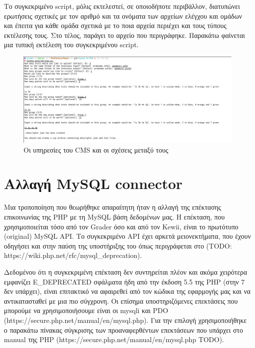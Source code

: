 \documentclass[diploma]{softlab-thesis}
\begin{document}
\bigskip

Το συγκεκριμένο script, μόλις εκτελεστεί, σε οποιοδήποτε περιβάλλον, διατυπώνει
ερωτήσεις σχετικές με τον αριθμό και τα ονόματα των αρχείων ελέγχου και ομάδων
και έπειτα για κάθε ομάδα σχετικά με το ποια αρχεία περιέχει και τους τύπους
εκτέλεσης τους. Στο τέλος, παράγει το αρχείο που περιγράφηκε. Παρακάτω φαίνεται
μια τυπική εκτέλεση του συγκεκριμένου script.


\begin{figure}
  \centering
  \includegraphics[scale=0.4,trim=4 4 4 4,clip]{Figures/interactive.png}
  \caption[Παράδειγμα χρήσης interactive generator script]{Οι υπηρεσίες του CMS και οι σχέσεις μεταξύ τους}
\end{figure}

\section{Αλλαγή MySQL connector}

Μια τροποποίηση που θεωρήθηκε απαραίτητη ήταν η αλλαγή της επέκτασης
επικοινωνίας της PHP με τη MySQL βάση δεδομένων μας. Η επέκταση, που
χρησιμοποιείται τόσο από τον Grader όσο και από τον Kewii, είναι το πρωτότυπο
(original) MySQL API. Το συγκεκριμένο API έχει αρκετά μειονεκτήματα, που έχουν
οδηγήσει και στην παύση της υποστήριξης του όπως περιγράφεται στο (TODO:
https://wiki.php.net/rfc/mysql\_deprecation).

\bigskip

Δεδομένου ότι η συγκεκριμένη επέκταση δεν συντηρείται πλέον και ακόμα χειρότερα
εμφανίζει E\_DEPRECATED σφάλματα ήδη από την έκδοση 5.5 της PHP (στην 7 δεν
υπάρχει), είναι επιτακτικό να αφαιρεθεί από τον κώδικα της εφαρμογής μας και να
αντικατασταθεί με μια πιο σύγχρονη. Οι επίσημα υποστηριζόμενες επεκτάσεις που
μπορούμε να χρησιμοποιήσουμε είναι οι mysqli και PDO
(https://secure.php.net/manual/en/mysql.php). Για την επιλογή χρησιμοποιήθηκε ο
παρακάτω πίνακας σύγκρισης των προαναφερθέντων επεκτάσεων που υπάρχει στο
manual της PHP (https://secure.php.net/manual/en/mysql.php TODO).
\end{document}
